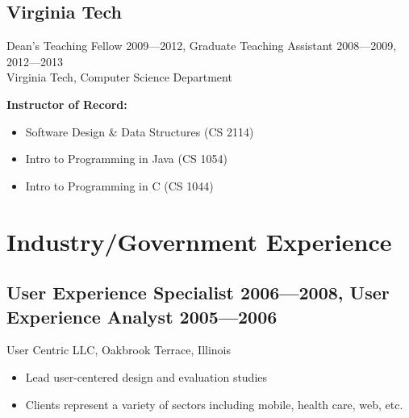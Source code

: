 \documentclass[10pt,letterpaper]{article}
\begin{document}
\subsection*{Virginia Tech}
Dean's Teaching Fellow 2009---2012, Graduate Teaching Assistant 2008---2009, 2012---2013 \\
Virginia Tech, Computer Science Department
\par \small\textbf{Instructor of Record:}
\begin{itemize}[leftmargin=1.5em]
\item Software Design \& Data Structures (CS 2114)
\item Intro to Programming in Java (CS 1054)
\item Intro to Programming in C (CS 1044)
\end{itemize}
\section*{Industry/Government Experience}
\subsection*{User Experience Specialist 2006---2008, User Experience Analyst 2005---2006}
User Centric LLC, Oakbrook Terrace, Illinois
\begin{itemize}[leftmargin=1.5em]
\item Lead user-centered design and evaluation studies
\item Clients represent a variety of sectors including mobile, health care, web, etc.
\end{itemize}
\end{document}

